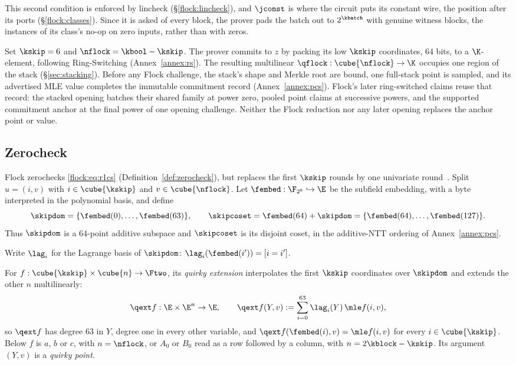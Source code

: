 This second condition is enforced by lincheck (\S\ref{flock:lincheck}), and $\jconst$ is where the circuit puts its constant wire, the position after its ports (\S\ref{flock:classes}). Since it is asked of every block, the prover pads the batch out to $2^{\kbatch}$ with genuine witness blocks, the instances of its class's no-op on zero inputs, rather than with zeros.

Set $\kskip=6$ and $\nflock=\kbool-\kskip$. The prover commits to $z$ by packing its low $\kskip$ coordinates, $64$ bits, to a $\K$-element, following Ring-Switching (Annex~\ref{annex:rs}). The resulting multilinear $\qflock:\cube{\nflock}\to\K$ occupies one region of the stack (\S\ref{sec:stacking}). Before any Flock challenge, the stack's shape and Merkle root are bound, one full-stack point is sampled, and its advertised MLE value completes the immutable commitment record (Annex~\ref{annex:pcs}). Flock's later ring-switched claims reuse that record: the stacked opening batches their shared family at power zero, pooled point claims at successive powers, and the supported commitment anchor at the final power of one opening challenge. Neither the Flock reduction nor any later opening replaces the anchor point or value.


\subsection{Zerocheck}\label{flock:zerocheck}

Flock zerochecks \eqref{flock:eq:r1cs} (Definition~\ref{def:zerocheck}), but replaces the first $\kskip$ rounds by one univariate round~\cite{Gru24}. Split $u=(i,v)$ with $i\in\cube{\kskip}$ and $v\in\cube{\nflock}$. Let $\fembed:\F_{2^8}\hookrightarrow\E$ be the subfield embedding, with a byte interpreted in the polynomial basis, and define
\[
\skipdom=\{\fembed(0),\ldots,\fembed(63)\},\qquad \skipcoset=\fembed(64)+\skipdom=\{\fembed(64),\ldots,\fembed(127)\}.
\]
Thus $\skipdom$ is a $64$-point additive subspace and $\skipcoset$ is its disjoint coset, in the additive-NTT ordering of Annex~\ref{annex:pcs}.

Write $\lag_i$ for the Lagrange basis of $\skipdom$: $\lag_i(\fembed(i'))=[i=i']$.

\begin{definition}\label{def:quirky}
For $f:\cube{\kskip}\times\cube{n}\to\Ftwo$, its \emph{quirky extension} interpolates the first $\kskip$ coordinates over $\skipdom$ and extends the other $n$ multilinearly:
\[
  \qext f:\E\times\E^{n}\to\E,\qquad
  \qext f(Y,v):=\sum_{i=0}^{63}\lag_i(Y)\,\mle f(i,v),
\]
so $\qext f$ has degree $63$ in $Y$, degree one in every other variable, and $\qext f(\fembed(i),v)=\mle f(i,v)$ for every $i\in\cube{\kskip}$. Below $f$ is $a$, $b$ or $c$, with $n=\nflock$, or $A_0$ or $B_0$ read as a row followed by a column, with $n=2\kblock-\kskip$. Its argument $(Y,v)$ is a \emph{quirky point}.
\end{definition}

